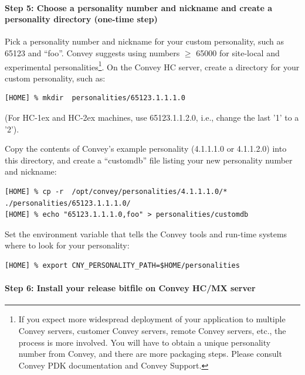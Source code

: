 \documentclass[twoside,letterpaper,11pt]{article}
\newcommand{\hm}{\hspace*{1em}}
\begin{document}

\paragraph{Step 5: Choose a personality number and nickname and create a personality directory (one-time step)}
\hm

Pick a personality number and nickname for your custom personality,
such as 65123 and ``foo''.  Convey suggests using numbers $\geq$ 65000
for site-local and experimental personalities\footnote{ If you expect
more widespread deployment of your application to multiple Convey
servers, customer Convey servers, remote Convey servers, etc., the
process is more involved.  You will have to obtain a unique
personality number from Convey, and there are more packaging steps.
Please consult Convey PDK documentation and Convey Support.}. On the
Convey HC server, create a directory for your custom personality, such
as:

\begin{Verbatim}[frame=single, label=Personality directory]
[HOME] % mkdir  personalities/65123.1.1.1.0
\end{Verbatim}
(For HC-1ex and HC-2ex machines, use 65123.1.1.2.0, i.e., change the last '1' to a '2').

Copy the contents of Convey's example personality (4.1.1.1.0 or 4.1.1.2.0) into
this directory, and create a ``customdb'' file listing your new
personality number and nickname:

\begin{Verbatim}[frame=single, label=Personality directory and customdb file]
[HOME] % cp -r  /opt/convey/personalities/4.1.1.1.0/*   ./personalities/65123.1.1.1.0/
[HOME] % echo "65123.1.1.1.0,foo" > personalities/customdb
\end{Verbatim}

Set the environment variable that tells the Convey tools and run-time
systems where to look for your personality:
\begin{Verbatim}[frame=single, label=Personality environment variable]
[HOME] % export CNY_PERSONALITY_PATH=$HOME/personalities
\end{Verbatim}


\paragraph{Step 6: Install your release bitfile on Convey HC/MX server}
\hm
\end{document}
